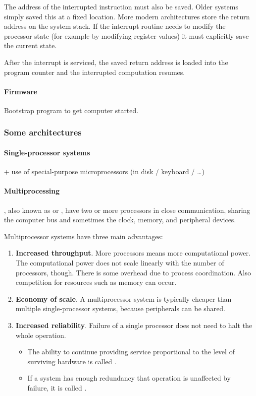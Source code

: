 The address of the interrupted instruction must also be saved. Older systems simply saved this at a fixed location. More modern architectures store the return address on the system stack. If the interrupt routine needs to modify the processor state (for example by modifying register values) it must explicitly save the current state.

After the interrupt is serviced, the saved return address is loaded into the program counter and the interrupted computation resumes.
\paragraph{Firmware}
Bootstrap program to get computer started.

\subsubsection{Some architectures}
\paragraph{Single-processor systems}
+ use of special-purpose microprocessors (in disk / keyboard / \ldots)
\paragraph{Multiprocessing}
, also known as  or , have two or more processors in close communication, sharing the computer bus and sometimes the clock, memory, and peripheral devices.

Multiprocessor systems have three main advantages:
\begin{enumerate}
\item \textbf{Increased throughput}. More processors means more computational power. The computational power does not scale linearly with the number of processors, though. There is some overhead due to process coordination. Also competition for resources such as memory can occur.
\item \textbf{Economy of scale}. A multiprocessor system is typically cheaper than multiple single-processor systems, because peripherals can be shared.
\item \textbf{Increased reliability}. Failure of a single processor does not need to halt the whole operation. \begin{itemize}
\item The ability to continue providing service proportional to the level of surviving hardware is called .
\item If a system has enough redundancy that operation is unaffected by failure, it is called .
\end{itemize}
\end{enumerate}

